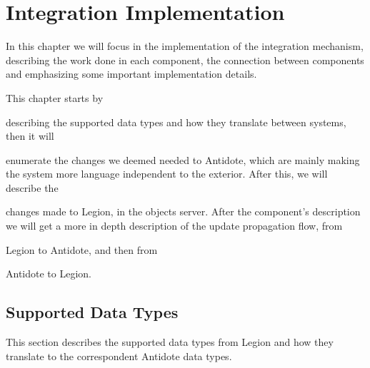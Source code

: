 \chapter{Integration Implementation}
\label{cha:integration_implementation}

In this chapter we will focus in the implementation of the integration mechanism, describing the work done in each component, the connection between components and emphasizing some important implementation details.\par
	This chapter starts by
\begin{enumerate*}[(i)]

\item describing the supported data types and how they translate between systems, then it will 

\item enumerate the changes we deemed needed to Antidote, which are mainly making the system more language independent to the exterior. After this, we will describe the 

\item changes made to Legion, in the objects server. After the component's description we will get a more in depth description of the update propagation flow, from

\item Legion to Antidote, and then from

\item Antidote to Legion.

\end{enumerate*}	

\section{Supported Data Types}
\label{sec:supported_data_types}
This section describes the supported data types from Legion and how they translate to the correspondent Antidote data types.

